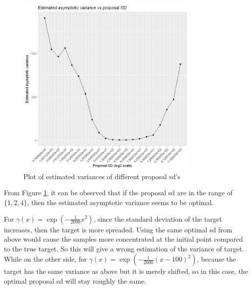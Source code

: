 \documentclass{article}
\begin{document}
\begin{figure}[H]
\centering
\includegraphics[width=0.8\textwidth, height=0.4\textheight]{est_var.png}
\caption{Plot of estimated variances of different proposal sd's}
\label{fig:est_var}
\end{figure}
From Figure \ref{fig:est_var}, it can be observed that if the proposal sd are in the range of $\{1, 2, 4\}$, then the estimated asymptotic variance seems to be optimal.

For $\gamma(x) = \exp(-\frac1{2000}x^2)$, since the standard deviation of the target increases, then the target is more spreaded. Using the same optimal sd from above would cause the samples more concentrated at the initial point compared to the true target. So this will give a wrong estimation of the variance of target. While on the other side, for $\gamma(x) = \exp(-\frac{1}{2000}(x - 100)^2)$, because the target has the same variance as above but it is merely shifted, so in this case, the optimal proposal sd will stay roughly the same.
 
\end{document}
